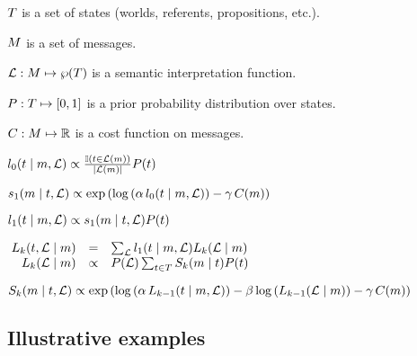 \documentclass{article}
\begin{document}
\begin{examples}
\item
\begin{examples}
  \item $\States$ is a set of states (worlds, referents, propositions, etc.).
  \item $\Messages$ is a set of messages.
  \item $\Lex: \Messages \mapsto \wp(\States)$ is a semantic
    interpretation function.
  \item $\Prior : \States \mapsto [0,1]$ is a prior probability
    distribution over states.    
  \item $\Costs : \Messages \mapsto \Reals$ is a cost function on messages.
  \end{examples}


\item\label{l0} $\listenerZero(\state \given \msg, \Lex) \propto 
  \frac{\mathbb{I}(\state \in \Lex(\msg))}{|\Lex(\msg)|}
  \Prior(\state)$

\item\label{s1} $\speakerOne(\msg \given \state, \Lex) \propto
  \exp
  \left(
    \log\left(\alpha\,\listenerZero(\state \given \msg, \Lex) \right)
    - 
    \gamma\,\Costs(\msg)
  \right)$

\item\label{l1} $\listenerOne(\state \given \msg, \Lex) \propto 
  \speakerOne(\msg \given \state, \Lex)
  \Prior(\state)$

\item\label{Lk}%
  \setlength{\arraycolsep}{2pt}%
  $\mspace{-4mu}\begin{array}[t]{r c l}
  \ListenerK(\state, \Lex \given \msg) 
  &=&
  \sum_{\Lex} \listenerOne(\state \given \msg, \Lex) \ListenerK(\Lex \given \msg) 
  \\
  \ListenerK(\Lex \given \msg) 
  &\propto& 
  \Prior(\Lex) \sum_{\state\in\States} \SpeakerK(\msg \given \state)\Prior(\state)
  \end{array}$

\item\label{Sk}
  $\SpeakerK(\msg \given \state, \Lex) \propto 
  \exp
  \left(
    \log
    \left(\alpha\,\ListenerK[k-1](\state \given \msg, \Lex)\right)
    - 
    \beta \log\left(\ListenerK[k-1](\Lex\given\msg)\right)
    -
    \gamma\,\Costs(\msg)
  \right)$
\end{examples}


\subsection{Illustrative examples}\label{sec:illustrations}
\end{document}
